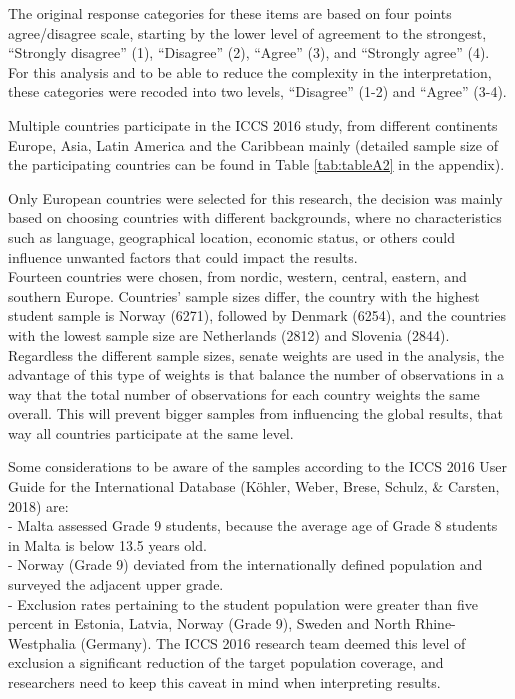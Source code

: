 \documentclass[12pt,a4paper,oneside]{reedthesis}
\begin{document}
The original response categories for these items are based on four points agree/disagree scale, starting by the lower level of agreement to the strongest, ``Strongly disagree'' (1), ``Disagree'' (2), ``Agree'' (3), and ``Strongly agree'' (4). For this analysis and to be able to reduce the complexity in the interpretation, these categories were recoded into two levels, ``Disagree'' (1-2) and ``Agree'' (3-4).

Multiple countries participate in the ICCS 2016 study, from different continents Europe, Asia, Latin America and the Caribbean mainly (detailed sample size of the participating countries can be found in Table \ref{tab:tableA2} in the appendix).

Only European countries were selected for this research, the decision was mainly based on choosing countries with different backgrounds, where no characteristics such as language, geographical location, economic status, or others could influence unwanted factors that could impact the results.\\
Fourteen countries were chosen, from nordic, western, central, eastern, and southern Europe. Countries' sample sizes differ, the country with the highest student sample is Norway (6271), followed by Denmark (6254), and the countries with the lowest sample size are Netherlands (2812) and Slovenia (2844). Regardless the different sample sizes, senate weights are used in the analysis, the advantage of this type of weights is that balance the number of observations in a way that the total number of observations for each country weights the same overall. This will prevent bigger samples from influencing the global results, that way all countries participate at the same level.

Some considerations to be aware of the samples according to the ICCS 2016 User Guide for the International Database (Köhler, Weber, Brese, Schulz, \& Carsten, 2018) are:\\
- Malta assessed Grade 9 students, because the average age of Grade 8 students in Malta is below 13.5 years old.\\
- Norway (Grade 9) deviated from the internationally defined population and surveyed the adjacent upper grade.\\
- Exclusion rates pertaining to the student population were greater than five percent in Estonia, Latvia, Norway (Grade 9), Sweden and North Rhine-Westphalia (Germany). The ICCS 2016 research team deemed this level of exclusion a significant reduction of the target population coverage, and researchers need to keep this caveat in mind when interpreting results.
\end{document}
